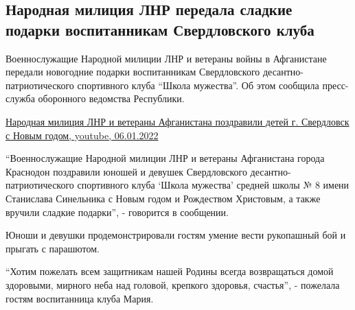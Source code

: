  
 
 
 
 
\subsection{Народная милиция ЛНР передала сладкие подарки воспитанникам Свердловского клуба}
\label{sec:06_01_2022.stz.news.lnr.lug_info.2.nm_lnr_podarki_deti}


Военнослужащие Народной милиции ЛНР и ветераны войны в Афганистане передали
новогодние подарки воспитанникам Свердловского десантно-патриотического
спортивного клуба \enquote{Школа мужества}. Об этом сообщила пресс-служба оборонного
ведомства Республики.

\href{https://www.youtube.com/watch?v=B74wHEugO1Q}{%
Народная милиция ЛНР и ветераны Афганистана поздравили детей г. Свердловск с Новым годом, %
youtube, 06.01.2022%
}


\enquote{Военнослужащие Народной милиции ЛНР и ветераны Афганистана города Краснодон
поздравили юношей и девушек Свердловского десантно-патриотического спортивного
клуба \enquote{Школа мужества} средней школы № 8 имени Станислава Синельника с Новым
годом и Рождеством Христовым, а также вручили сладкие подарки}, - говорится в
сообщении.


Юноши и девушки продемонстрировали гостям умение вести рукопашный бой и прыгать
с парашютом.


\enquote{Хотим пожелать всем защитникам нашей Родины всегда возвращаться домой
здоровыми, мирного неба над головой, крепкого здоровья, счастья}, - пожелала
гостям воспитанница клуба Мария.

